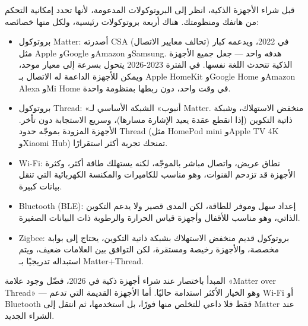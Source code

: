 


قبل شراء الأجهزة الذكية، انظر إلى البروتوكولات المدعومة، لأنها تحدد إمكانية التحكم من هاتفك ومنظومتك. هناك أربعة بروتوكولات رئيسية، ولكل منها خصائصه:

\begin{itemize}
  \item بروتوكول Matter: أصدرته CSA (تحالف معايير الاتصال) في 2022، ويدعمه كبار مثل Apple وGoogle وAmazon وSamsung. هدفه واحد — جعل جميع الأجهزة الذكية تتحدث اللغة نفسها. في الفترة 2023-2026 يتحول بسرعة إلى معيار موحد، ويمكن للأجهزة الداعمة له الاتصال بـ Apple HomeKit وGoogle Home وAmazon Alexa وMi Home في وقت واحد، دون ربطها بمنظومة واحدة.
  \item بروتوكول Thread: «أنبوب» الشبكة الأساسي لـ Matter. منخفض الاستهلاك، وشبكة ذاتية التكوين (إذا انقطع عقدة يعيد الإشارة مسارها)، وسريع الاستجابة دون تأخر. الأجهزة المزودة بموجّه حدود Thread (مثل HomePod mini وApple TV 4K وXiaomi Hub) تمنحك تجربة أكثر استقرارًا.
  \item Wi-Fi: نطاق عريض، واتصال مباشر بالموجّه، لكنه يستهلك طاقة أكثر، وكثرة الأجهزة قد تزدحم القنوات، وهو مناسب للكاميرات والمكنسة الكهربائية التي تنقل بيانات كبيرة.
  \item Bluetooth (BLE): إعداد سهل وموفر للطاقة، لكن المدى قصير ولا يدعم التكوين الذاتي، وهو مناسب للأقفال وأجهزة قياس الحرارة والرطوبة ذات البيانات الصغيرة.
  \item Zigbee: بروتوكول قديم منخفض الاستهلاك بشبكة ذاتية التكوين، يحتاج إلى بوابة مخصصة، والأجهزة رخيصة ومستقرة، لكن التوافق بين العلامات ضعيف، ويتم استبداله تدريجيًا بـ Matter+Thread.
\end{itemize}

\begin{tcbinfo}{المبدأ باختصار}
عند شراء أجهزة ذكية في 2026، فضّل وجود علامة «Matter over Thread» — وهو الخيار الأكثر استدامة حاليًا. أما الأجهزة القديمة التي تدعم Wi-Fi أو Bluetooth فقط فلا داعي للتخلص منها فورًا، بل استخدمها، ثم انتقل إلى Matter عند الشراء الجديد.

\end{tcbinfo}

